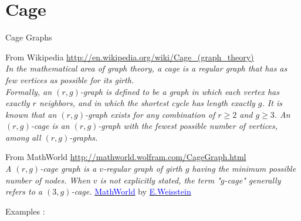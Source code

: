 \newpage\section{Cage}\label{cage}
\begin{NewMacroBox}{Cage Graphs}{}

\medskip
From Wikipedia  \url{http://en.wikipedia.org/wiki/Cage_(graph_theory)}\\
\emph{In the mathematical area of graph theory, a cage is a regular graph that has as few vertices as possible for its girth.\\
Formally, an $(r,g)$-graph is defined to be a graph in which each vertex has exactly $r$ neighbors, and in which the shortest cycle has length exactly $g$. It is known that an $(r,g)$-graph exists for any combination of $r \geq 2$ and $g \geq 3$. An $(r,g)$-cage is an $(r,g)$-graph with the fewest possible number of vertices, among all $(r,g)$-graphs.}

\medskip
From MathWorld \url{http://mathworld.wolfram.com/CageGraph.html}\\
\emph{A $(r,g)$-cage graph is a $v$-regular graph of girth $g$ having the minimum possible number of nodes. When $v$ is not explicitly stated, the term "$g$-cage" generally refers to a $(3,g)$-cage.}
\href{http://mathworld.wolfram.com/topics/GraphTheory.html}%
           {\textcolor{blue}{MathWorld}} by \href{http://en.wikipedia.org/wiki/Eric_W._Weisstein}%
           {\textcolor{blue}{E.Weisstein}}

\medskip
Examples :


\end{NewMacroBox}
